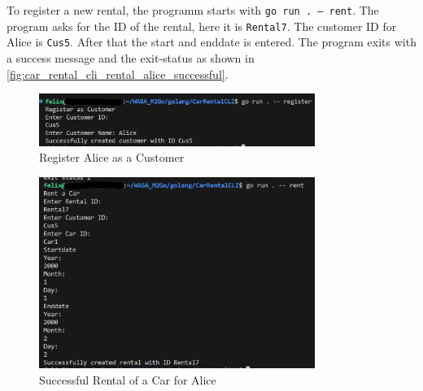 To register a new rental, the programm starts with \texttt{go run . -- rent}.
The program asks for the ID of the rental, here it is \texttt{Rental7}.
The customer ID for Alice is \texttt{Cus5}.
After that the start and enddate is entered.
The program exits with a success message and the exit-status as shown in \autoref{fig:car_rental_cli_rental_alice_successful}.

\begin{figure}
      \centering
      \includegraphics[width=0.8\textwidth]{figures/goLang/carRental/carRentalCLI/carRentalCLI_RegisterAlice.png}
      \caption{Register Alice as a Customer}
      \label{fig:car_rental_cli_register_alice}
\end{figure}
\begin{figure}
      \centering
      \includegraphics[width=0.8\textwidth]{figures/goLang/carRental/carRentalCLI/carRentalCLI_SuccessfulRentalAlice.png}
      \caption{Successful Rental of a Car for Alice}
      \label{fig:car_rental_cli_rental_alice_successful}
\end{figure}
